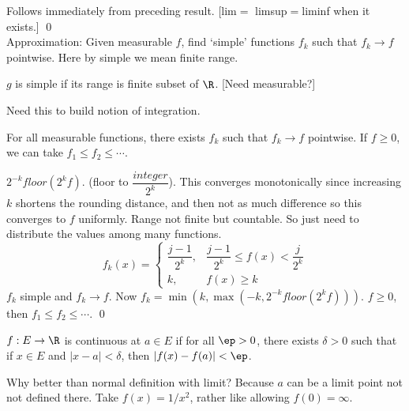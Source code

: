 \pf Follows immediately from preceding result. [lim$=$ limsup$=$liminf when it exists.] \qed \\









Approximation: Given measurable $f$, find `simple' functions $f_k$ such that $f_k \to f$ pointwise. Here by simple we mean finite range. 

\begin{dfn}[Simple]
$g$ is simple if its range is finite subset of $\R$. [Need measurable?]
\end{dfn}


Need this to build notion of integration. 

\begin{thm}
For all measurable functions, there exists $f_k$ such that $f_k \to f$ pointwise. If $f \geq 0$, we can take $f_1 \leq f_2 \leq \cdots$.
\end{thm}

\pf $2^{-k} floor(2^k f)$. (floor to $\dfrac{integer}{2^k}$). This converges monotonically since increasing $k$ shortens the rounding distance, and then not as much difference so this converges to $f$ uniformly. Range not finite but countable. So just need to distribute the values among many functions. 
	\[
	f_k(x)=
	\begin{cases}
	\dfrac{j-1}{2^k}, & \dfrac{j-1}{2^k} \leq f(x) < \dfrac{j}{2^k} \\
	k, & f(x) \geq k
	\end{cases}
	\]
$f_k$ simple and $f_k \to f$. Now $f_k= \min(k,\max(-k,2^{-k}floor(2^kf)))$. $f \geq 0$, then $f_1 \leq f_2 \leq \cdots$. 
\qed \\








\begin{dfn}
$f: E \to \R$ is continuous at $a \in E$ if for all $\ep>0$, there exists $\delta>0$ such that if $x \in E$ and $|x-a|<\delta$, then $|f(x)-f(a)|<\ep$.
\end{dfn}

Why better than normal definition with limit? Because $a$ can be a limit point not not defined there. Take $f(x)=1/x^2$, rather like allowing $f(0)=\infty$. 


